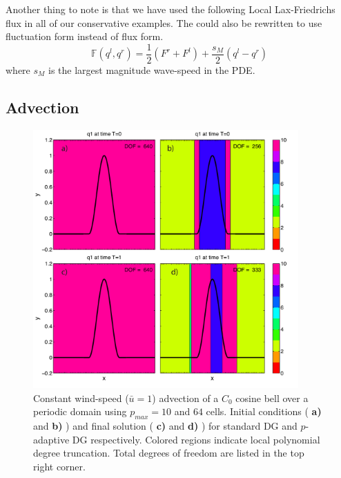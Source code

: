 \documentclass[10]{amsart}
\begin{document}
Another thing to note is that we have used the following Local Lax-Friedrichs flux in all of our conservative examples.
The could also be rewritten to use fluctuation form instead of flux form.
$$\mathbb{F}(q^l,q^r)=\frac{1}{2}\left(F^r+F^l\right) + \frac{s_M}{2}\left(q^l-q^r\right)$$
where $s_M$ is the largest magnitude wave-speed in the PDE.
\subsection{Advection}

\begin{figure}
\hfil\includegraphics[width=4.0in]{figures/cosbellCmpre_E64N10.pdf}\hfil
\caption{Constant wind-speed ($\bar u = 1$) advection of a $C_0$ cosine bell over a periodic domain using $p_{max} = 10$ and $64$ cells. Initial conditions ( {\bf a)} and {\bf b)} ) and final solution ( {\bf c)} and {\bf d)} ) for standard DG and $p$-adaptive DG respectively. Colored regions indicate local polynomial degree truncation. Total degrees of freedom are listed in the top right corner. } \label{cosbellCmpre}
\end{figure}
\end{document}
